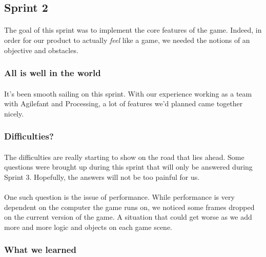 \subsection{Sprint 2}

\paragraph{} The goal of this sprint was to implement the core features of the game. Indeed, in order for our product to actually \emph{feel} like a game, we needed the notions of an objective and obstacles.

\subsubsection{All is well in the world}

\paragraph{} It's been smooth sailing on this sprint. With our experience working as a team with Agilefant and Processing, a lot of features we'd planned came together nicely.

\subsubsection{Difficulties?}

\paragraph{} The difficulties are really starting to show on the road that lies ahead. Some questions were brought up during this sprint that will only be answered during Sprint 3. Hopefully, the answers will not be too painful for us.

\paragraph{} One such question is the issue of performance. While performance is very dependent on the computer the game runs on, we noticed some frames dropped on the current version of the game. A situation that could get worse as we add more and more logic and objects on each game scene.

\subsubsection{What we learned}

